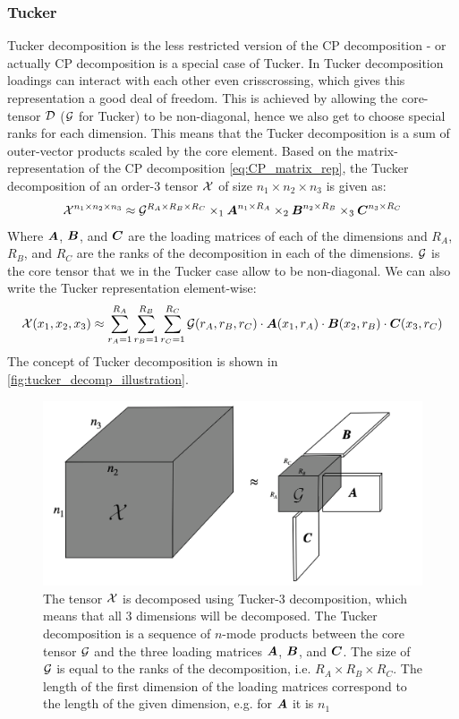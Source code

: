\subsubsection{Tucker}
Tucker decomposition is the less restricted version of the CP decomposition - or actually CP decomposition is a special case of Tucker. In Tucker decomposition loadings can interact with each other even crisscrossing, which gives this representation a good deal of freedom. This is achieved by allowing the core-tensor $\mathcal{D}$ ($\mathcal{G}$ for Tucker) to be non-diagonal, hence we also get to choose special ranks for each dimension. This means that the Tucker decomposition is a sum of outer-vector products scaled by the core element. Based on the matrix-representation of the CP decomposition \eqref{eq:CP_matrix_rep}, the Tucker decomposition of an order-3 tensor $\mathcal{X}$ of size $n_1 \times n_2 \times n_3$ is given as:
\begin{equation}
    \mathcal{X}^{n_1 \times n_2 \times n_3} \approx \mathcal{G}^{R_A \times R_B \times R_C} \times_1 \boldsymbol{A}^{n_1 \times R_A} \times_2 \boldsymbol{B}^{n_2 \times R_B} \times_3 \boldsymbol{C}^{n_3 \times R_C}
\end{equation}
Where $\boldsymbol{A}$, $\boldsymbol{B}$, and $\boldsymbol{C}$ are the loading matrices of each of the dimensions and $R_A$, $R_B$, and $R_C$ are the ranks of the decomposition in each of the dimensions. $\mathcal{G}$ is the core tensor that we in the Tucker case allow to be non-diagonal. We can also write the Tucker representation element-wise:
\begin{equation}
    \mathcal{X}(x_1,x_2,x_3) \approx \sum_{r_A=1}^{R_A} \sum_{r_B=1}^{R_B} \sum_{r_C=1}^{R_C} \mathcal{G}(r_A, r_B, r_C) \cdot \boldsymbol{A}(x_1, r_A) \cdot \boldsymbol{B}(x_2, r_B) \cdot \boldsymbol{C}(x_3, r_C)
\end{equation}
The concept of Tucker decomposition is shown in \autoref{fig:tucker_decomp_illustration}. 
\begin{figure}
    \centering
    \captionsetup{width=.95\linewidth}
    \includegraphics[width=.7\linewidth]{Pics/02_Theory/Tucker_decomp_illustration.png}
    \caption{The tensor $\mathcal{X}$ is decomposed using Tucker-3 decomposition, which means that all 3 dimensions will be decomposed. The Tucker decomposition is a sequence of $n$-mode products between the core tensor $\mathcal{G}$ and the three loading matrices $\boldsymbol{A}$, $\boldsymbol{B}$, and $\boldsymbol{C}$. The size of $\mathcal{G}$ is equal to the ranks of the decomposition, i.e. $R_A \times R_B \times R_C$. The length of the first dimension of the loading matrices correspond to the length of the given dimension, e.g. for $\boldsymbol{A}$ it is $n_1$}
    \label{fig:tucker_decomp_illustration}
\end{figure}
